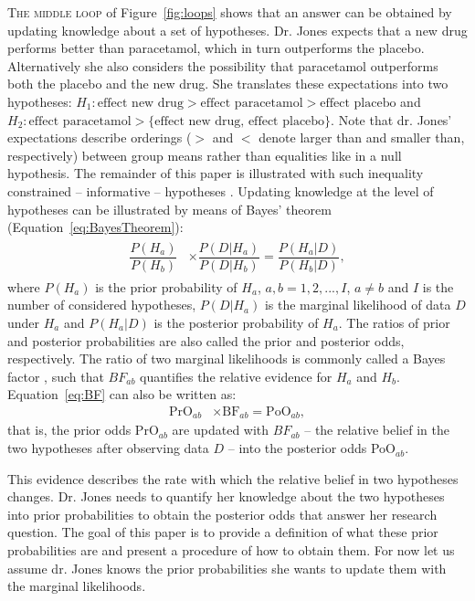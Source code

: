 \documentclass[man]{apa6}
\begin{document}
\textsc{The middle loop} of Figure~\ref{fig:loops} shows that an answer can be obtained by updating knowledge about a set of hypotheses.
Dr. Jones expects that a new drug performs better than paracetamol, which in turn outperforms the placebo.
Alternatively she also considers the possibility that paracetamol outperforms both the placebo and the new drug.
She translates these expectations into two hypotheses: $H_1: \text{effect new drug} > \text{effect paracetamol} > \text{effect placebo}$ and $H_2: \text{effect paracetamol} > \{ \text{effect new drug, effect placebo} \}$.
Note that dr. Jones' expectations describe orderings ($>$ and $<$ denote larger than and smaller than, respectively) between group means rather than equalities like in a null hypothesis.
The remainder of this paper is illustrated with such inequality constrained -- informative -- hypotheses \cite{hoijtink12book,klugkist05}.
Updating knowledge at the level of hypotheses can be illustrated by means of Bayes' theorem (Equation~\ref{eq:BayesTheorem}):
\begin{align}
\label{eq:BF}
\begin{split}
\dfrac{P(H_a)}{P(H_b)}  & \times  \dfrac{P(D|H_a)}{P(D|H_b)}  =  \dfrac{P(H_a|D)}{P(H_b|D)},
\end{split}
\end{align}
where $P(H_a)$ is the prior probability of $H_a$, $a,b = 1,2,...,I$, $a\neq b$ and $I$ is the number of considered hypotheses, $P(D|H_a)$ is the marginal likelihood of data $D$ under $H_a$ and $P(H_a|D)$ is the posterior probability of $H_a$. 
The ratios of prior and posterior probabilities are also called the prior and posterior odds, respectively. 
The ratio of two marginal likelihoods is commonly called a Bayes factor \cite{kass95}, such that $BF_{ab}$ quantifies the relative evidence for $H_a$ and $H_b$.
Equation~\ref{eq:BF} can also be written as:
\begin{align}
\text{PrO}_{ab}  & \times  \text{BF}_{ab} =  \text{PoO}_{ab},
\end{align} 
that is, the prior odds PrO$_{ab}$ are updated with $BF_{ab}$ -- the relative belief in the two hypotheses after observing data $D$ -- into the posterior odds PoO$_{ab}$.

This evidence describes the rate with which the relative belief in two hypotheses changes.
Dr. Jones needs to quantify her knowledge about the two hypotheses into prior probabilities to obtain the posterior odds that answer her research question.
The goal of this paper is to provide a definition of what these prior probabilities are and present a procedure of how to obtain them.
For now let us assume dr. Jones knows the prior probabilities she wants to update them with the marginal likelihoods.
\end{document}
